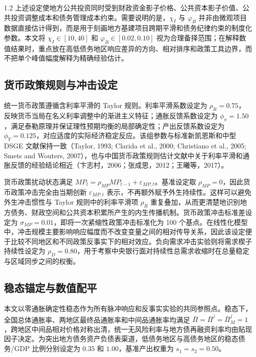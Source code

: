 \documentclass[12pt,UTF8]{ctexart}
\begin{document}
\begin{spacing}{1.2}
		上述设定使地方公共投资同时受到财政资金影子价格、公共资本影子价值、公共投资调整成本和债务管理成本约束。需要说明的是，$\chi_I$ 与 $\varphi_B$ 并非由微观项目数据直接估计得到，而是用于刻画地方基建项目跨期平滑和债务纪律约束的制度化参数。本文将 $\chi_I\in[10,40]$ 和 $\varphi_B\in[0.02,0.10]$ 视为合理备择范围；在解释数值结果时，重点放在高低债务地区响应差异的方向、相对排序和政策工具边界，而不把单个峰值幅度解释为精确经验估计。

		\subsection{货币政策规则与冲击设定}
		
		统一货币政策遵循含利率平滑的 Taylor 规则。利率平滑系数设定为 $\rho_R=0.75$，反映货币当局在名义利率调整中的渐进主义特征；通胀反馈系数设定为 $\phi_\pi=1.50$，满足泰勒原理并保证理性预期均衡的局部确定性；产出反馈系数设定为 $\phi_Y=0.125$，对应适度的实际经济稳定反应。该组参数与标准新凯恩斯和中型 DSGE 文献保持一致（Taylor, 1993; Clarida et al., 2000; Christiano et al., 2005; Smets and Wouters, 2007），也与中国货币政策规则估计文献中关于利率平滑和通胀反馈的经验结论相近（卞志村，2006；张成思，2012；王曦等，2017）。
		
		货币政策扰动状态满足 $MP_t=\rho_{MP}MP_{t-1}+\varepsilon_{MP,t}$。基准设定取 $\rho_{MP}=0$，因此货币政策冲击完全由当期创新 $\varepsilon_{MP,t}$ 表示，不再额外赋予外生持续性。这样可以避免外生冲击惯性与 Taylor 规则中的利率平滑项 $\rho_R$ 重复叠加，从而更清楚地识别地方债务、财政空间和公共资本积累所产生的内生传播机制。货币政策冲击标准差设定为 $\sigma_{MP}=0.01$，即将一次紧缩性政策冲击标准化为 100 个基点。在线性化模型中，冲击规模主要影响响应幅度而不改变变量之间的相对传导关系，因此该设定便于比较不同地区和不同政策反事实下的相对效应。负向需求冲击实验则将需求楔子持续性设定为 $\rho_D=0.80$，用于考察中央银行面对持续性总需求收缩时在总量稳定与区域同步之间的权衡。
		
		\subsection{稳态锚定与数值配平}
		
		本文以零通胀确定性稳态作为所有脉冲响应和反事实实验的共同参照点。稳态下，全国总体通胀率、两地区最终品通胀率和中间品通胀率均满足 $\bar{\Pi}=\bar{\Pi}^j=\bar{\Pi}_M^j=1$，跨地区中间品相对价格对称出清，统一无风险利率与地方债再融资利率均由贴现因子决定。为突出地方债务资产负债表渠道，低债务地区与高债务地区的稳态债务/GDP 比例分别设定为 $0.35$ 和 $1.00$，基准产出权重为 $s_1=s_2=0.50$。
		

\end{spacing}
\end{document}
